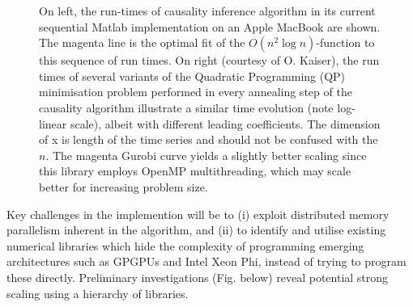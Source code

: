\documentclass[a0,portrait]{a0poster}
\begin{document}
\begin{multicols}{2}
\begin{figure}[H]
\begin{center}
{}
 \caption{On left, the run-times of causality inference algorithm in
its current sequential Matlab implementation on an Apple MacBook are shown. The
magenta line is the optimal fit of the $O(n^2 \log n)$-function to this sequence of run times.  On right (courtesy of O. Kaiser), the run times of several variants of the Quadratic Programming (QP) minimisation problem performed in every annealing step of the causality algorithm illustrate a similar time evolution (note log-linear scale), albeit with different leading coefficients. The dimension of x is length of the time series and should not be confused with the $n$. The magenta Gurobi curve yields a slightly better scaling since this library employs OpenMP multithreading, which may scale better for increasing problem size. }
 \end{center} \label{fig:perf}
\end{figure}

\vspace{-0.5cm}
\noindent
{\large Key challenges in the implemention  will be to (i)  exploit distributed memory parallelism inherent in the algorithm, and (ii) to identify and utilise existing numerical libraries which hide the complexity of programming emerging architectures such as GPGPUs and Intel Xeon Phi, instead of trying to program these directly.  Preliminary investigations (Fig. below) reveal potential strong scaling using a hierarchy of libraries.}


\end{multicols}
\end{document}
